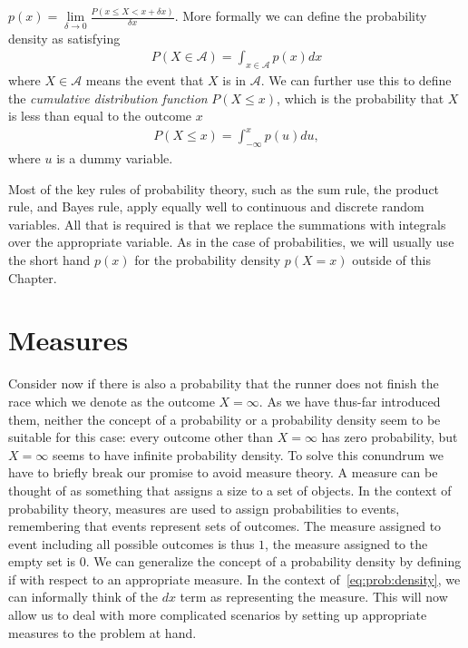 $p(x) = \lim\limits_{\delta\rightarrow0} \frac{P(x\le X <x+\delta x)}{\delta x}$.  More formally
we can define the probability density as satisfying
\begin{align}
\label{eq:prob:density}
P(X\in \mathcal{A}) = \int_{x\in\mathcal{A}} p(x) dx
\end{align}
where $X\in \mathcal{A}$ means the event that $X$ is in $\mathcal{A}$.  We can further
use this to define the \emph{cumulative distribution function} $P(X\le x)$, which is the probability
that $X$ is less than equal to the outcome $x$
\begin{align}
\label{eq:prob:cumulative}
P(X\le x) = \int_{-\infty}^{x} p(u) du,
\end{align}
where $u$ is a dummy variable.

Most of the key rules of probability theory, such as the sum rule, the product rule, and Bayes
rule, apply equally well to continuous and discrete random variables.  All that is required
is that we replace the summations with integrals over the appropriate variable.  As in
the case of probabilities, we will usually use the short hand $p(x)$ for the probability density
$p(X=x)$ outside of this Chapter.

\section{Measures}
\label{sec:prob:measure}

Consider now if there is also a probability that the runner does not finish the race which
we denote as the outcome $X=\infty$.  As we
have thus-far introduced them, neither the concept of a probability or a probability density
seem to be suitable for this case: every outcome other than $X=\infty$ has zero probability,
but $X=\infty$ seems to have infinite probability density.  To solve this conundrum we 
have to briefly break our promise to avoid measure theory.  A measure can be thought of
as something that assigns a size to a set of objects.  In the context of probability theory,
measures are used to assign probabilities to events, remembering that events represent 
sets of outcomes.  The measure assigned to event including all possible outcomes is thus $1$,
the measure assigned to the empty set is $0$.  We can generalize the concept of a probability 
density by defining if with respect to an appropriate measure.  In the context of~\eqref{eq:prob:density}, we can informally think of the $dx$ term as representing the measure.
This will now allow us to
deal with more complicated scenarios by setting up appropriate measures to the problem at hand.

